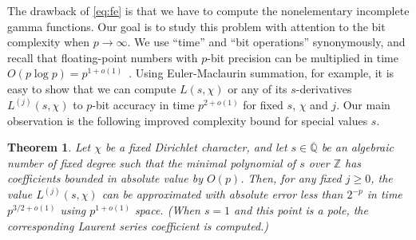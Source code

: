 \documentclass[reqno]{amsart}
\newcommand{\QQ}{\mathbb{Q}}
\newtheorem{theorem}{Theorem}
\theoremstyle{definition}
\begin{document}
The drawback of \eqref{eq:fe} is that we have
to compute the nonelementary incomplete gamma functions.
Our goal is to study this problem
with attention to the bit complexity when $p \to \infty$.
We use ``time'' and ``bit operations'' synonymously, and
recall that floating-point numbers with $p$-bit precision
can be multiplied in time $O(p \log p) = p^{1+o(1)}$~\cite{Harvey2021}.
Using Euler-Maclaurin summation, for example, it is easy to show that
we can compute $L(s,\chi)$ or any of its $s$-derivatives $L^{(j)}(s,\chi)$
to $p$-bit accuracy in time $p^{2+o(1)}$
for fixed $s$, $\chi$ and $j$.
Our main observation is the following improved complexity bound
for special values $s$.



\begin{theorem}
Let $\chi$ be a fixed Dirichlet character,
and let $s \in \overline{\QQ}$ be an algebraic number of fixed degree
such that the minimal polynomial of $s$ over $\mathbb{Z}$
has coefficients bounded in absolute value by $O(p)$.
Then, for any fixed $j \ge 0$, the value
$L^{(j)}(s,\chi)$
can be approximated with absolute error less than $2^{-p}$ in time $p^{3/2+o(1)}$ using $p^{1+o(1)}$ space.
(When $s = 1$ and this point is a pole, the corresponding Laurent series coefficient is computed.)
\label{thm:complexity}
\end{theorem}
\end{document}
